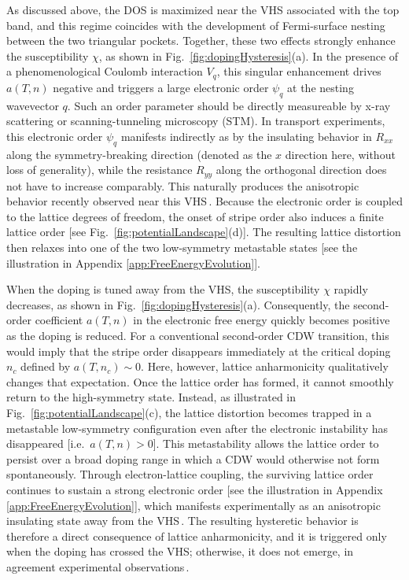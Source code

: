 \documentclass[aps,prx,article,twocolumn,amsmath,amssymb,superscriptaddress,longbibliography]{revtex4-2}
\begin{document}
As discussed above, the DOS is maximized near the VHS associated with the top band, and this regime coincides with the development of Fermi-surface nesting between the two triangular pockets. Together, these two effects strongly enhance the susceptibility $\chi$, as shown in Fig.~\ref{fig:dopingHysteresis}(a). In the presence of a phenomenological Coulomb interaction $V_q$, this singular enhancement drives $a(T,n)$ negative and triggers a large electronic order $\psi_q$ at the nesting wavevector $q$. Such an order parameter should be directly measureable by x-ray scattering or scanning-tunneling microscopy (STM). In transport experiments, this electronic order $\psi_q$ manifests indirectly as by the insulating behavior in $R_{xx}$ along the symmetry-breaking direction (denoted as the $x$ direction here, without loss of generality), while the resistance $R_{yy}$ along the orthogonal direction does not have to increase comparably. This naturally produces the anisotropic behavior recently observed near this VHS\,\cite{zhao2026hysteretical}. Because the electronic order is coupled to the lattice degrees of freedom, the onset of stripe order also induces a finite lattice order [see Fig.~\ref{fig:potentialLandscape}(d)]. The resulting lattice distortion then relaxes into one of the two low-symmetry metastable states [see the illustration in Appendix \ref{app:FreeEnergyEvolution}].

When the doping is tuned away from the VHS, the susceptibility $\chi$ rapidly decreases, as shown in Fig.~\ref{fig:dopingHysteresis}(a). Consequently, the second-order coefficient $a(T,n)$ in the electronic free energy quickly becomes positive as the doping is reduced. For a conventional second-order CDW transition, this would imply that the stripe order disappears immediately at the critical doping $n_c$ defined by $a(T,n_c)\sim 0$. Here, however, lattice anharmonicity qualitatively changes that expectation. Once the lattice order has formed, it cannot smoothly return to the high-symmetry state. Instead, as illustrated in Fig.~\ref{fig:potentialLandscape}(c), the lattice distortion becomes trapped in a metastable low-symmetry configuration even after the electronic instability has disappeared [i.e.~$a(T,n)> 0$]. This metastability allows the lattice order to persist over a broad doping range in which a CDW would otherwise not form spontaneously. Through electron-lattice coupling, the surviving lattice order continues to sustain a strong electronic order [see the illustration in Appendix \ref{app:FreeEnergyEvolution}], which manifests experimentally as an anisotropic insulating state away from the VHS\,\cite{zhao2026hysteretical}. The resulting hysteretic behavior is therefore a direct consequence of lattice anharmonicity, and it is triggered only when the doping has crossed the VHS; otherwise, it does not emerge, in agreement experimental observations\,\cite{zhao2026hysteretical}.
\end{document}
